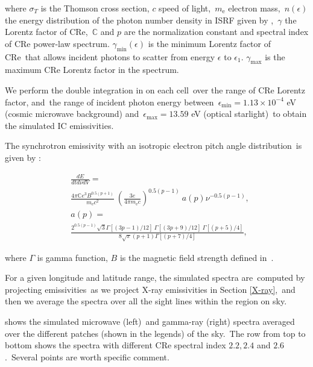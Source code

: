 \documentclass[twocolumn]{aastex631}
\begin{document}
where $\sigma_{T}$ is the Thomson cross section, $c$ speed of light,\
$m_{\text{e}}$ electron mass,\
$n(\epsilon)$ the energy distribution of the photon number density in ISRF given by \citet{Porter2017},\
$\gamma$ the Lorentz factor of CRe,\
$\mathbb{C}$ and $p$ are the normalization constant and spectral index of CRe power-law spectrum.
$\gamma_{\text{min}}(\epsilon)$ is the minimum Lorentz factor of CRe\
that allows incident photons to scatter from energy $\epsilon$ to $\epsilon_{1}$.
$\gamma_{\text{max}}$ is the maximum CRe Lorentz factor in the spectrum.

We perform the double integration in \Cref{gammaray-emissivity} on each cell\
over the range of CRe Lorentz factor, and\
the range of incident photon energy between\
$\epsilon_{\text{min}}=1.13\times10^{-4}$ eV (cosmic microwave background) and\
$\epsilon_{\text{max}}=13.59$ eV (optical starlight)\
to obtain the simulated IC emissivities.


The synchrotron emissivity with an isotropic electron pitch angle distribution\
is given by \citet{BLUMENTHAL1970}:

\begin{subequations}
   \begin{align}
      &\frac{dE}{dtd\nu dV} =\nonumber\\
      &\frac{4\pi\mathbb{C}e^{3}B^{0.5(p+1)}}{m_{\text{e}}c^{2}}\
      \left(\frac{3e}{4\pi m_{\text{e}}c}\right)^{0.5(p-1)}\
      a(p)\nu^{-0.5(p-1)},\\
      &a(p)=\nonumber\\
           &\frac{2^{0.5(p-1)}\sqrt{3}\Gamma\left[\left(3p-1\right)/12\right]\
                                      \Gamma\left[\left(3p+9\right)/12\right]\
                                      \Gamma\left[\left(p+5\right)/4\right]}
      {8\sqrt{\pi}(p+1)\Gamma\left[\left(p+7\right)/4\right]},
   \end{align}
   \label{synchrotron-emissivity}
\end{subequations}

where $\Gamma$ is gamma function, $B$ is the magnetic field strength defined in\
.

For a given longitude and latitude range, the simulated spectra are\
computed by projecting emissivities\
as we project X-ray emissivities in Section \ref{X-ray},\
and then we average the spectra over all the sight lines within the region on sky.


 shows the simulated microwave (left)\
and gamma-ray (right) spectra averaged over the different patches (shown in the legends) of the sky.\
The row from top to bottom shows the spectra with different CRe spectral index $2.2, 2.4$ and $2.6$.\
Several points are worth specific comment.\
\end{document}
